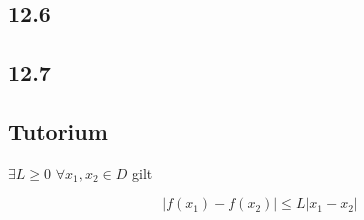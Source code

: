 \subsection{12.6}

\subsection{12.7}

\newpage

\subsection{Tutorium}

\begin{definition}[L-stetig]
$\exists L\geq0$ $\forall x_1,x_2\in D$ gilt

\begin{equation*}
|f(x_1)-f(x_2)|\leq L|x_1-x_2|
\end{equation*}

\end{definition}
